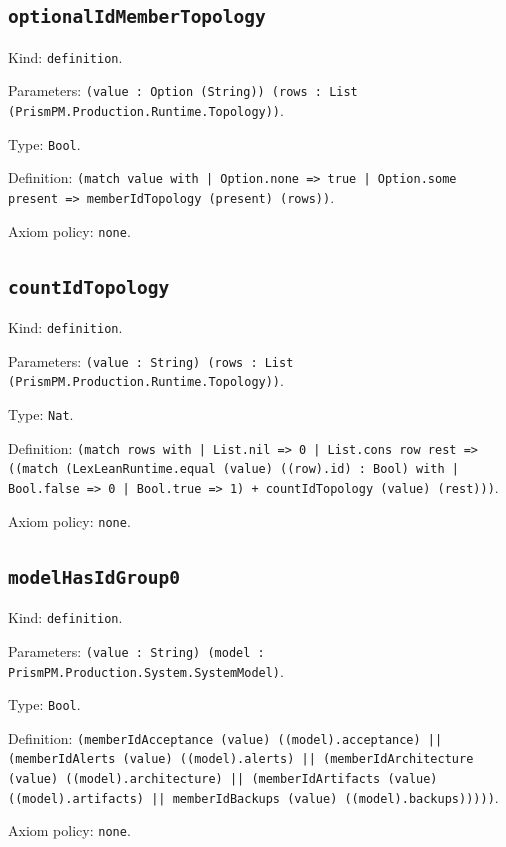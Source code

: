 \documentclass[11pt]{article}
\begin{document}
\subsection*{\texttt{optionalIdMemberTopology}}
\noindent Kind: \texttt{definition}.\par
\noindent Parameters: \texttt{(value : Option (String)) (rows : List (PrismPM.Production.Runtime.Topology))}.\par
\noindent Type: \texttt{Bool}.\par
\noindent Definition: \texttt{(match value with | Option.none => true | Option.some present => memberIdTopology (present) (rows))}.\par
\noindent Axiom policy: \texttt{none}.\par
\subsection*{\texttt{countIdTopology}}
\noindent Kind: \texttt{definition}.\par
\noindent Parameters: \texttt{(value : String) (rows : List (PrismPM.Production.Runtime.Topology))}.\par
\noindent Type: \texttt{Nat}.\par
\noindent Definition: \texttt{(match rows with | List.nil => 0 | List.cons row rest => ((match (LexLeanRuntime.equal (value) ((row).id) : Bool) with | Bool.false => 0 | Bool.true => 1) + countIdTopology (value) (rest)))}.\par
\noindent Axiom policy: \texttt{none}.\par
\subsection*{\texttt{modelHasIdGroup0}}
\noindent Kind: \texttt{definition}.\par
\noindent Parameters: \texttt{(value : String) (model : PrismPM.Production.System.SystemModel)}.\par
\noindent Type: \texttt{Bool}.\par
\noindent Definition: \texttt{(memberIdAcceptance (value) ((model).acceptance) || (memberIdAlerts (value) ((model).alerts) || (memberIdArchitecture (value) ((model).architecture) || (memberIdArtifacts (value) ((model).artifacts) || memberIdBackups (value) ((model).backups)))))}.\par
\noindent Axiom policy: \texttt{none}.\par
\end{document}
